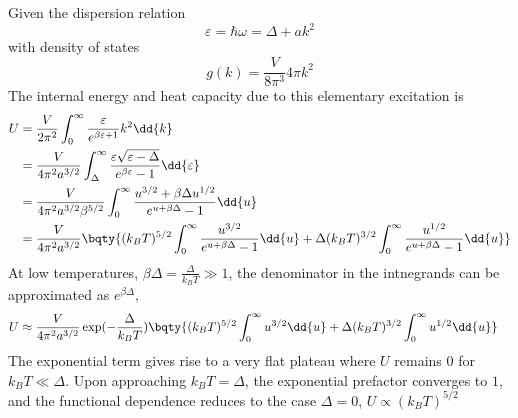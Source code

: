 \documentclass[12pt]{article}
\begin{document}
     \subsection{} Given the dispersion relation \[
        \varepsilon = \hbar \omega = \Delta  + ak^2
    \]
    with density of states \[
        g(k) = \frac{V}{8\pi^3} 4\pi k^2
    \]
    The internal energy and heat capacity due to this elementary excitation is \begin{align*}
        U &= \frac{V}{2\pi^2}\int_0^{\infty} \frac{\varepsilon}{e^{\beta \varepsilon + 1}}  k^2 \dd{k} \\
        &= \frac{V}{4\pi^2 a^{3 /2}} \int_\Delta^{\infty} \frac{\varepsilon \sqrt{\varepsilon - \Delta}}{e^{\beta \varepsilon} - 1}\dd{\varepsilon} \\
        &= \frac{V}{4\pi^2 a^{3 /2}\beta^{5 /2}} \int_0^{\infty} \frac{u^{3 /2} +\beta \Delta u^{1 /2}}{e^{u + \beta \Delta } - 1}\dd{u} \\
        &= \frac{V}{4\pi^2 a^{3 /2}}\bqty{ (k_BT)^{5 /2}\int_0^{\infty} \frac{u^{3 /2}}{e^{u + \beta \Delta } - 1}\dd{u} + \Delta (k_BT)^{3 /2} \int_0^{\infty} \frac{u^{1 /2}}{e^{u + \beta \Delta } - 1}\dd{u} }
    \end{align*}
    At low temperatures, \(\beta \Delta = \frac{\Delta}{k_BT} \gg 1\), the denominator in the intnegrands can be approximated as \(e^{\beta \Delta }\), \begin{align*}
        U& \approx \frac{V}{4\pi^2 a^{3 /2}} \exp( -\frac{\Delta}{k_BT}) \bqty{ (k_BT)^{5 /2}\int_0^{\infty} u^{3 /2}\dd{u} + \Delta (k_BT)^{3 /2} \int_0^{\infty} u^{1 /2}\dd{u} }
    \end{align*}
    The exponential term gives rise to a very flat plateau where \(U\) remains \(0\) for \(k_BT \ll \Delta \). Upon approaching \(k_BT = \Delta \), the exponential prefactor converges to \(1\), and the functional dependence reduces to the case \(\Delta = 0\), \(U\propto (k_BT)^{5 /2}\)
    \begin{center}
        \def\svgwidth{200pt}
    \end{center}
\end{document}
